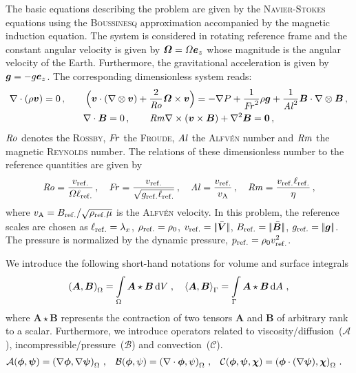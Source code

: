 The basic equations describing the problem are given by the \textsc{Navier}-\textsc{Stokes} equations using the \textsc{Boussinesq} approximation accompanied by the magnetic induction equation. The system is considered in rotating reference frame and the constant angular velocity is given by $\bm{\varOmega}=\varOmega\bm{e}_z$ whose magnitude is the angular velocity of the Earth. Furthermore, the gravitational acceleration is given by $\bm{g}=-g\bm{e}_z$. The corresponding dimensionless system reads:
\begin{gather}
	\nabla\cdot(\rho\bm{v})=0\,, \qquad
	\Big(\bm{v}\cdot(\nabla\otimes\bm{v})+\frac{2}{\mathit{Ro}}\bm{\varOmega}\times\bm{v}\Big)=-\nabla P+\frac{1}{\mathit{Fr}^2}\rho\bm{g}+\frac{1}{\mathit{Al}^2}\bm{B}\cdot\nabla\otimes\bm{B}\,,\\
	\nabla\cdot\bm{B}=0\,, \qquad
	\mathit{Rm}\nabla\times\left(\bm{v}\times\bm{B}\right)+\nabla^2\bm{B}=\bm{0}\,,
\end{gather}
$\mathit{Ro}$ denotes the \textsc{Rossby}, $\mathit{Fr}$ the \textsc{Froude}, $\mathit{Al}$ the \textsc{Alfv\'en} number and $\mathit{Rm}$ the magnetic \textsc{Reynolds} number. The relations of these dimensionless number to the reference quantities are given by
\begin{equation}
	\mathit{Ro}=\frac{v_{\mathrm{ref.}}}{\varOmega\ell_{\mathrm{ref.}}}\,,\quad
	\mathit{Fr}=\frac{v_{\mathrm{ref.}}}{\sqrt{g_{\mathrm{ref.}}\ell_{\mathrm{ref.}}}}\,,\quad
	\mathit{Al}=\frac{v_{\mathrm{ref.}}}{v_\mathrm{A}}\,,\quad 
	\mathit{Rm}=\frac{v_{\mathrm{ref.}}\ell_{\mathrm{ref.}}}{\eta}\,,
\end{equation}
where $v_\mathrm{A}=B_{\mathrm{ref.}}/\sqrt{\rho_{\mathrm{ref.}}\mu}$ is the \textsc{Alfv\'en} velocity. In this problem, the reference scales are chosen as $\ell_{\mathrm{ref.}}=\lambda_x$, $\rho_{\mathrm{ref.}}=\rho_0$, $v_{\mathrm{ref.}}=|\!| \bar{\bm{V}} |\!|$, $B_{\mathrm{ref.}}=|\!| \bar{\bm{B}} |\!|$, $g_{\mathrm{ref.}}=|\!| \bm{g} |\!|$. The pressure is normalized by the dynamic pressure, \ie $p_\mathrm{ref.}=\rho_0v_{\mathrm{ref.}}^2$.

We introduce the following short-hand notations for volume and surface integrals
\begin{equation*}
	\left(\bm A, \bm B\right)_{\Omega} = \int\limits_{\Omega} \bm A \star \bm B\, \mathrm{d}V \; , \quad
	\left\langle\bm A, \bm B\right\rangle_{\Gamma}  = \int\limits_{\Gamma} \bm A \star \bm B\, \mathrm{d}A \ ,
\end{equation*}
where $\bm A \star \bm B$ represents the contraction of two tensors $\bm A$ and $\bm B$ of arbitrary rank to a scalar. Furthermore, we introduce operators related to viscosity/diffusion~($\mathcal{A}$), incompressible/pressure~($\mathcal{B}$) and convection~($\mathcal{C}$).
\begin{align*}
\begin{aligned}
	\mathcal{A}(\bm{\phi}, \bm{\psi})&=\left(\nabla\bm{\phi}, \nabla\bm{\psi}\right)_{\Omega}\,, &
	\mathcal{B}(\bm{\phi}, \psi)&=\left(\nabla\cdot\bm{\phi}, \psi\right)_{\Omega}\,, &
	\mathcal{C}(\bm{\phi}, \bm{\psi}, \bm{\chi})&=\left(\bm{\phi} \cdot (\nabla\bm{\psi}), \bm{\chi}\right)_{\Omega}\,.
\end{aligned}
\end{align*}

